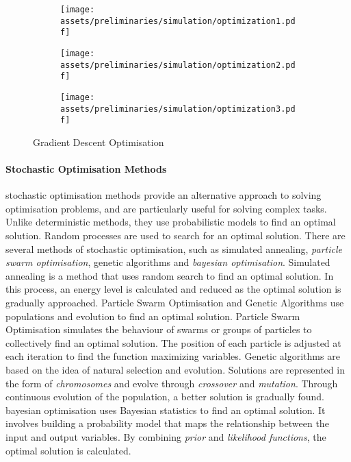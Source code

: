 \documentclass[a4paper, 12pt]{report}
\begin{document}
\begin{figure}
\centering
\begin{subfigure}{.33\textwidth}
\centering
\texttt{[image: assets/preliminaries/simulation/optimization1.pdf]}
\label{fig:optimisation-1}
\end{subfigure}%
\begin{subfigure}{.33\textwidth}
\centering
\texttt{[image: assets/preliminaries/simulation/optimization2.pdf]}
\label{fig:optimisation-2}
\end{subfigure}%
\begin{subfigure}{.33\textwidth}
\centering
\texttt{[image: assets/preliminaries/simulation/optimization3.pdf]}
\label{fig:optimisation-3}
\end{subfigure}
\caption{Gradient Descent Optimisation}
\label{fig:gradient-descent-optimisation}
\end{figure}

\paragraph{Stochastic Optimisation Methods}\label{par:stochastic-optimisation-methods}

\Gls{stochastic} optimisation methods provide an alternative approach to solving optimisation problems, and are particularly useful for solving complex tasks. Unlike \gls{deterministic} methods, they use probabilistic models to find an optimal solution. Random processes are used to search for an optimal solution. There are several methods of \gls{stochastic} optimisation, such as simulated annealing, \textit{particle swarm optimisation}, genetic algorithms and \textit{\Gls{bayesian optimisation}}. Simulated annealing is a method that uses random search to find an optimal solution. In this process, an energy level is calculated and reduced as the optimal solution is gradually approached. Particle Swarm Optimisation and Genetic Algorithms use populations and evolution to find an optimal solution. Particle Swarm Optimisation simulates the behaviour of swarms or groups of particles to collectively find an optimal solution. The position of each particle is adjusted at each iteration to find the function maximizing variables. Genetic algorithms are based on the idea of natural selection and evolution. Solutions are represented in the form of \textit{chromosomes} and evolve through \textit{crossover} and \textit{mutation}. Through continuous evolution of the population, a better solution is gradually found. \Gls{bayesian optimisation} uses Bayesian statistics to find an optimal solution. It involves building a probability model that maps the relationship between the input and output variables. By combining \textit{prior} and \textit{likelihood functions}, the optimal solution is calculated.
\end{document}
